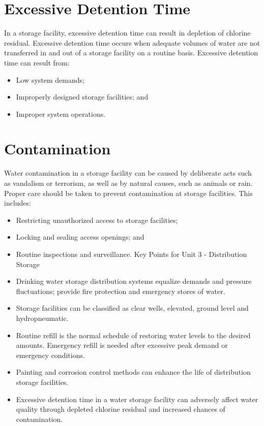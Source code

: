 \documentclass[10pt]{article}
\begin{document}
\section{Excessive Detention Time}
In a storage facility, excessive detention time can result in depletion of chlorine residual. Excessive detention time occurs when adequate volumes of water are not transferred in and out of a storage facility on a routine basis. Excessive detention time can result from:

\begin{itemize}
  \item Low system demands;

  \item Improperly designed storage facilities; and

  \item Improper system operations.

\end{itemize}
\section{Contamination}
Water contamination in a storage facility can be caused by deliberate acts such as vandalism or terrorism, as well as by natural causes, such as animals or rain. Proper care should be taken to prevent contamination at storage facilities. This includes:

\begin{itemize}
  \item Restricting unauthorized access to storage facilities;

  \item Locking and sealing access openings; and

  \item Routine inspections and surveillance. Key Points for Unit 3 - Distribution Storage

  \item Drinking water storage distribution systems equalize demands and pressure fluctuations; provide fire protection and emergency stores of water.

  \item Storage facilities can be classified as clear wells, elevated, ground level and hydropneumatic.

  \item Routine refill is the normal schedule of restoring water levels to the desired amounts. Emergency refill is needed after excessive peak demand or emergency conditions.

  \item Painting and corrosion control methods can enhance the life of distribution storage facilities.

  \item Excessive detention time in a water storage facility can adversely affect water quality through depleted chlorine residual and increased chances of contamination.

\end{itemize}
\end{document}
